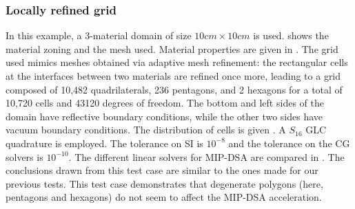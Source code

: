 \subsubsection{Locally refined grid}

In this example, a 3-material domain of size $10cm\times 10cm$ is used. 
 shows the material zoning and the mesh used. Material properties 
are given in . The grid used mimics meshes obtained via adaptive mesh
refinement: the rectangular cells at the interfaces between two materials are refined once more,
leading to a grid composed of 10,482 quadrilaterals, 236 pentagons,
and 2 hexagons for a total of 10,720 cells and 43120 degrees of freedom. The bottom
and left sides of the domain have reflective boundary conditions, while the other two sides
have vacuum boundary conditions. 
%
The distribution of cells is given .
A $S_{16}$ GLC quadrature is employed. The tolerance on SI is $10^{-8}$ and
the tolerance on the CG solvers is $10^{-10}$.
The different linear solvers for MIP-DSA are compared in .
%
The conclusions drawn from this test case are similar to the ones made for 
our previous tests. This test case demonstrates that degenerate polygons 
(here, pentagons and hexagons) do not seem to affect the MIP-DSA acceleration.


